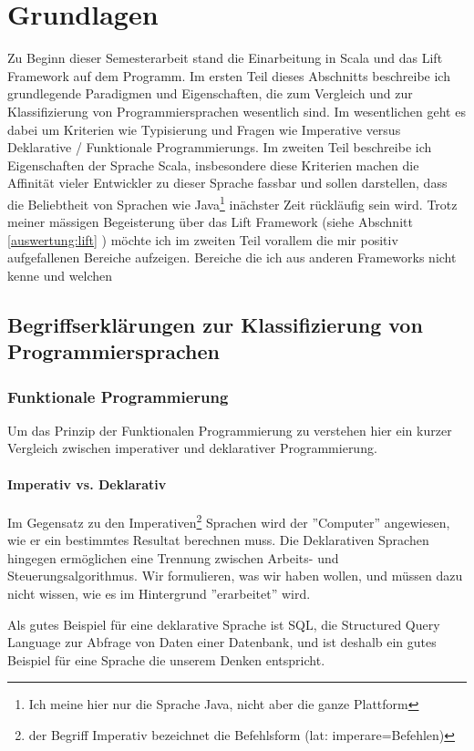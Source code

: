 \chapter{Grundlagen}
Zu Beginn dieser Semesterarbeit stand die Einarbeitung in Scala und das Lift Framework auf dem Programm. Im ersten Teil dieses Abschnitts beschreibe ich grundlegende Paradigmen und Eigenschaften, die zum Vergleich und zur Klassifizierung von Programmiersprachen wesentlich sind.  Im wesentlichen geht es dabei um Kriterien wie Typisierung und Fragen wie Imperative versus Deklarative / Funktionale Programmierungs.  Im zweiten Teil beschreibe ich Eigenschaften der Sprache Scala, insbesondere diese Kriterien machen die Affinit\"at vieler Entwickler zu dieser Sprache  fassbar und sollen darstellen, dass die Beliebtheit von Sprachen wie Java\footnote{Ich meine hier nur die Sprache Java, nicht aber die ganze Plattform} in\"achster Zeit r\"uckl\"aufig sein wird. Trotz meiner m\"assigen Begeisterung \"uber das Lift Framework (siehe Abschnitt \ref{auswertung:lift} ) m\"ochte ich im zweiten Teil vorallem die mir positiv aufgefallenen Bereiche aufzeigen. Bereiche die ich aus anderen Frameworks nicht kenne und welchen 

\section{Begriffserkl\"arungen zur Klassifizierung von Programmiersprachen}
 \subsection{Funktionale Programmierung}
Um das Prinzip der Funktionalen Programmierung zu verstehen hier ein kurzer Vergleich zwischen imperativer und deklarativer Programmierung.
\subsubsection{Imperativ vs. Deklarativ}
Im Gegensatz zu den Imperativen\footnote{der Begriff Imperativ bezeichnet die Befehlsform (lat: imperare=Befehlen)} Sprachen wird der ''Computer'' angewiesen, wie er ein bestimmtes Resultat berechnen muss. Die Deklarativen Sprachen hingegen erm\"oglichen eine Trennung zwischen Arbeits- und Steuerungsalgorithmus. Wir formulieren, was wir haben wollen, und m\"ussen dazu nicht wissen, wie es im Hintergrund ''erarbeitet'' wird.

Als gutes Beispiel f\"ur eine deklarative Sprache ist SQL, die Structured Query Language zur Abfrage von Daten einer Datenbank, und ist deshalb ein gutes Beispiel f\"ur eine Sprache die unserem Denken entspricht. 

